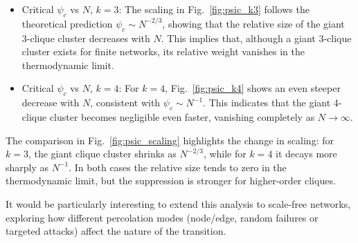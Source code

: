 \begin{itemize}
\item Critical $\psi_c$ vs $N$, $k=3$:  
The scaling in Fig.~\ref{fig:psic_k3} follows the theoretical prediction $\psi_c \sim N^{-2/3}$, showing that the relative size of the giant 3-clique cluster decreases with $N$.  
This implies that, although a giant 3-clique cluster exists for finite networks, its relative weight vanishes in the thermodynamic limit.

\item Critical $\psi_c$ vs $N$, $k=4$:  
For $k=4$, Fig.~\ref{fig:psic_k4} shows an even steeper decrease with $N$, consistent with $\psi_c \sim N^{-1}$.  
This indicates that the giant 4-clique cluster becomes negligible even faster, vanishing completely as $N \to \infty$.  
\end{itemize}

The comparison in Fig.~\ref{fig:psic_scaling} highlights the change in scaling:  
for $k=3$, the giant clique cluster shrinks as $N^{-2/3}$, while for $k=4$ it decays more sharply as $N^{-1}$.  
In both cases the relative size tends to zero in the thermodynamic limit, but the suppression is stronger for higher-order cliques.

It would be particularly interesting to extend this analysis to scale-free networks, exploring how different percolation modes (node/edge, random failures or targeted attacks) affect the nature of the transition.


\newpage